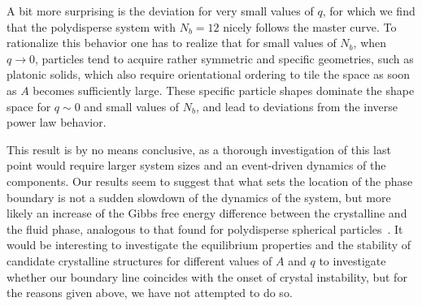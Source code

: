 A  bit more surprising is the deviation for very small values of $q$, for which we find that the polydisperse system with $N_b=12$ nicely follows the master curve.
To rationalize this behavior one has to realize that for small values of $N_b$, when $q\rightarrow 0$, particles tend to acquire rather symmetric and specific geometries, such as platonic solids, which 
also require orientational ordering  to tile the space as soon as $A$ becomes sufficiently large. These specific particle shapes dominate the shape space for $q\sim 0$ and small values of $N_b$,
and lead to deviations from the inverse power law behavior.  

This result is by no means conclusive, as a thorough investigation of this last point would require larger system sizes 
and an event-driven dynamics of the components.  Our results seem to suggest that what sets the location of 
the phase boundary is not a sudden slowdown of the dynamics of the system, but more likely
 an increase of the Gibbs free energy difference between the crystalline  and the fluid phase, analogous to
that found for polydisperse spherical particles~\cite{frenkel2}. 
It would be interesting to investigate the equilibrium properties and the stability of 
candidate crystalline structures for different values of $A$ and $q$ to investigate whether our boundary line 
coincides with the onset of crystal instability, but for the reasons given above, we have not attempted to do so.

